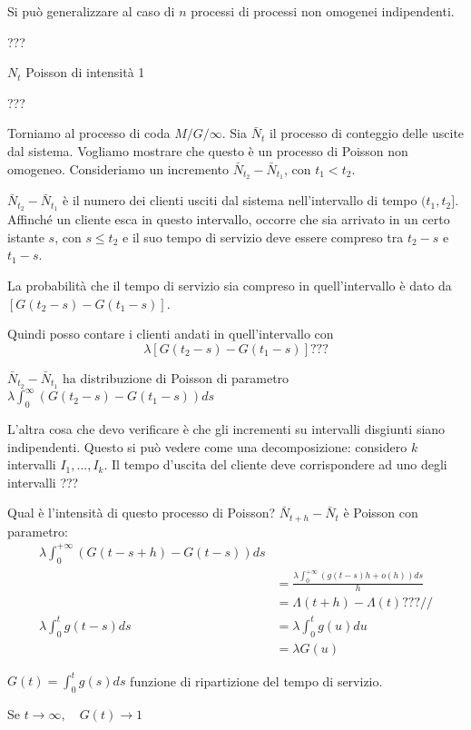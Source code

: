 \documentclass[a4paper,12pt]{book}
\begin{document}
Si può generalizzare al caso di $ n $ processi di processi non omogenei indipendenti. 

??? %

$ N_t $ Poisson di intensità 1

??? %

Torniamo al processo di coda $ M/G/\infty $. Sia $ \bar{N}_t $ il processo di conteggio delle uscite dal sistema. Vogliamo mostrare che questo è un processo di Poisson non omogeneo. Consideriamo un incremento $ \bar{N}_{t_2} - \bar{N}_{t_1} $, con $ t_1 < t_2 $.

$ \bar{N}_{t_2} - \bar{N}_{t_1} $ è il numero dei clienti usciti dal sistema nell'intervallo di tempo $ (t_1, t_2] $. Affinché un cliente esca in questo intervallo, occorre che sia arrivato in un certo istante $ s $, con $ s \le t_2 $ e il suo tempo di servizio deve essere compreso tra $ t_2 - s $ e $ t_1 - s $.

La probabilità che il tempo di servizio sia compreso in quell'intervallo è dato da $ [G(t_2 - s) - G(t_1 - s)] $.

Quindi posso contare i clienti andati in quell'intervallo con 
$$ \lambda[G(t_2 - s) - G(t_1 - s)] ???$$ %

$ \bar{N}_{t_2} - \bar{N}_{t_1} $ ha distribuzione di Poisson di parametro $\lambda \int_{0}^{\infty} (G(t_2 - s) - G(t_1 - s)) d s$

L'altra cosa che devo verificare è che gli incrementi su intervalli disgiunti siano indipendenti. Questo si può vedere come una decomposizione: considero $ k $ intervalli $ I_1, ..., I_k $. Il tempo d'uscita del cliente deve corrispondere ad uno degli intervalli ??? %

Qual è l'intensità di questo processo di Poisson?
$ \bar{N}_{t+h} - \bar{N}_{t} $ è Poisson con parametro:
\begin{align*}
	\lambda \int_{0}^{+\infty}(G(t-s+h) - G(t-s)) ds \\
	& = \frac{\lambda\int_{0}^{+\infty} (g(t-s)h + o(h)) ds }{h} \\
	& = \Lambda(t+h) - \Lambda(t) ??? // %
	\\
	\lambda\int_{0}^{t}g(t-s)ds & = \lambda\int_{0}^{t} g(u)du \\
	& = \lambda G(u)
\end{align*}

$ G(t) = \int_{0}^{t} g(s) ds $ funzione di ripartizione del tempo di servizio. 

Se $ t \to \infty, \quad G(t) \to 1 $
\end{document}
